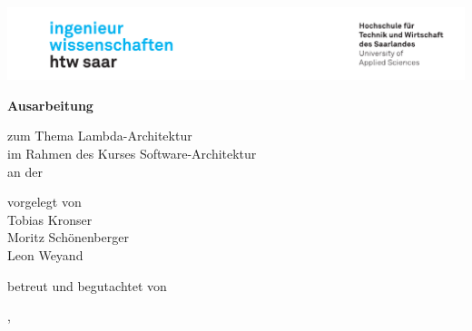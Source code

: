 \begin{titlepage}\linespread{1.5}\selectfont
\includegraphics[width=\linewidth]{Graphics/htwsaar_Logo_inwi_head_VF_4C_crop}
  \begin{center}
    \large  
    \hfill
    \vfill
    \begingroup
      \Large\bfseries Ausarbeitung 
    \endgroup
		
		\bigskip
		
    zum Thema Lambda-Architektur \\
    im Rahmen des Kurses Software-Architektur \\
    an der \myUni \\
    
  \vfill
	
  \begingroup
    \Large\bfseries\myTitle 
  \endgroup
	
	\bigskip
	
  vorgelegt von \\
  Tobias Kronser \\
  Moritz Schönenberger \\
  Leon Weyand \\
	
  \vfill
	
  betreut und begutachtet von \\
  \myFirstProf 
	
  \vfill
	
  \myLocation, \myTime                   

    \end{center}       
\end{titlepage}   